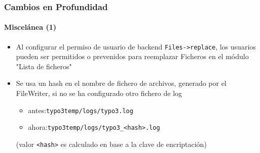 
\begin{frame}[fragile]
	\frametitle{Cambios en Profundidad}
	\framesubtitle{Miscelánea (1)}

	\lstset{basicstyle=\tiny\ttfamily}

	\begin{itemize}

		\item Al configurar el permiso de usuario de backend \texttt{Files->replace}, los usuarios pueden ser
			permitidos o prevenidos para reemplazar Ficheros en el módulo "Lista de ficheros"


		\item Se usa un hash en el nombre de fichero de archivos, generado por el FileWriter,
			si no se ha configurado otro fichero de log

			\begin{itemize}
				\item antes:\tabto{1.2cm}\texttt{typo3temp/logs/typo3.log}
				\item ahora:\tabto{1.2cm}\texttt{typo3temp/logs/typo3\_<hash>.log}
			\end{itemize}

			\small(valor \texttt{<hash>} es calculado en base a la clave de encriptación)\normalsize


	\end{itemize}

\end{frame}

